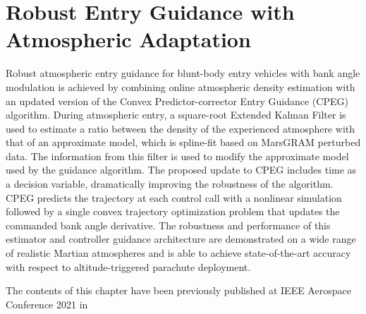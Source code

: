 \graphicspath{{cpeg2/}}


\chapter{Robust Entry Guidance with Atmospheric Adaptation}
\label{sec:cpeg2}

Robust atmospheric entry guidance for blunt-body entry vehicles with bank angle modulation is achieved by combining online atmospheric density estimation with an updated version of the Convex Predictor-corrector Entry Guidance (CPEG) algorithm. During atmospheric entry, a square-root Extended Kalman Filter is used to estimate a ratio between the density of the experienced atmosphere with that of an approximate model, which is spline-fit based on MarsGRAM perturbed data. The information from this filter is used to modify the approximate model used by the guidance algorithm. The proposed update to CPEG includes time as a decision variable, dramatically improving the robustness of the algorithm. CPEG predicts the trajectory at each control call with a nonlinear simulation followed by a single convex trajectory optimization problem that updates the commanded bank angle derivative. The robustness and performance of this estimator and controller guidance architecture are demonstrated on a wide range of realistic Martian atmospheres and is able to achieve state-of-the-art accuracy with respect to altitude-triggered parachute deployment.

The contents of this chapter have been previously published at IEEE Aerospace Conference 2021 in \citet{tracy2023}